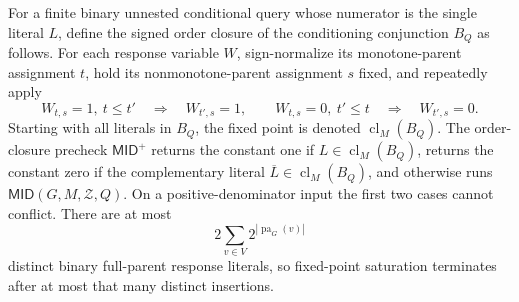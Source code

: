 For a finite binary unnested conditional query whose numerator is the single literal \(L\), define the signed order closure of the conditioning conjunction \(B_Q\) as follows.  For each response variable \(W\), sign-normalize its monotone-parent assignment \(t\), hold its nonmonotone-parent assignment \(s\) fixed, and repeatedly apply
\[
 W_{t,s}=1,\ t\le t'
 \quad\Longrightarrow\quad W_{t',s}=1,
 \qquad
 W_{t,s}=0,\ t'\le t
 \quad\Longrightarrow\quad W_{t',s}=0.
\tag{1}
\]
Starting with all literals in \(B_Q\), the fixed point is denoted \(\operatorname{cl}_M(B_Q)\).  The order-closure precheck \(\mathsf{MID}^{+}\) returns the constant one if \(L\in\operatorname{cl}_M(B_Q)\), returns the constant zero if the complementary literal \(\overline L\in\operatorname{cl}_M(B_Q)\), and otherwise runs \(\mathsf{MID}(G,M,\mathcal Z,Q)\).  On a positive-denominator input the first two cases cannot conflict.  There are at most
\[
 2\sum_{v\in V}2^{|\operatorname{pa}_G(v)|}
\]
distinct binary full-parent response literals, so fixed-point saturation terminates after at most that many distinct insertions.